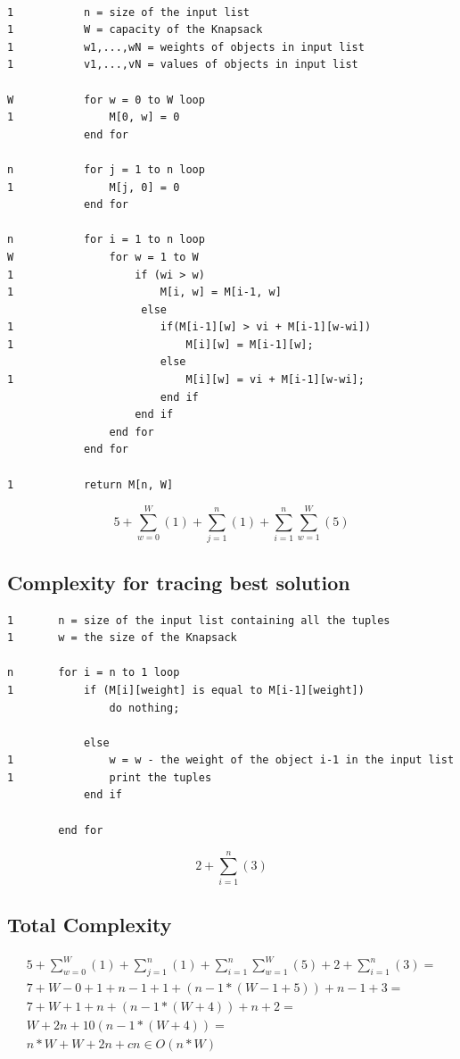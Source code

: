 \documentclass{inc/mas}
\begin{document}
\begin{lstlisting}

1			n = size of the input list
1			W = capacity of the Knapsack
1			w1,...,wN = weights of objects in input list
1			v1,...,vN = values of objects in input list

W			for w = 0 to W loop
1				M[0, w] = 0
			end for

n			for j = 1 to n loop
1				M[j, 0] = 0
			end for

n			for i = 1 to n loop
W				for w = 1 to W
1					if (wi > w)
1						M[i, w] = M[i-1, w]
					 else
1						if(M[i-1][w] > vi + M[i-1][w-wi])
1							M[i][w] = M[i-1][w];						
						else
1							M[i][w] = vi + M[i-1][w-wi];
						end if
					end if
				end for
			end for

1			return M[n, W]

\end{lstlisting}


\begin{equation}
 5+\sum^W_{w=0}(1)+\sum^n_{j=1}(1)+\sum^n_{i=1}\sum^W_{w=1}(5)
\end{equation}




\subsection{Complexity for tracing best solution}

\begin{lstlisting}
1		n = size of the input list containing all the tuples
1		w = the size of the Knapsack 

n		for i = n to 1 loop
1			if (M[i][weight] is equal to M[i-1][weight])
				do nothing;
	
			else
1				w = w - the weight of the object i-1 in the input list
1				print the tuples
			end if 
	
		end for
\end{lstlisting}

\begin{equation}
 2+\sum^n_{i=1}(3)
\end{equation}

\subsection{Total Complexity}
\begin{equation}
\begin{split}
 5+\sum^W_{w=0}(1)+\sum^n_{j=1}(1)+\sum^n_{i=1}\sum^W_{w=1}(5)+ 2+\sum^n_{i=1}(3)= \\
7+W-0+1+n-1+1+(n-1*(W-1+5))+n-1+3= \\
7+W+1+n+(n-1*(W+4))+n+2= \\
W+2n+10(n-1*(W+4))= \\
n*W+W+2n+cn \in O(n*W)
\end{split}
\end{equation}
\end{document}
